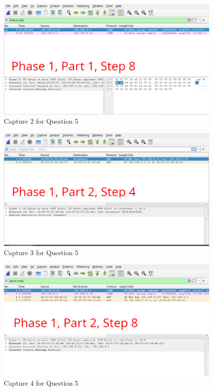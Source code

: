 \begin{figure}
\centering
\includegraphics{data/q5-capture2.png}
\caption{Capture 2 for Question 5}
\end{figure}

\begin{figure}
\centering
\includegraphics{data/q5-capture3.png}
\caption{Capture 3 for Question 5}
\end{figure}

\begin{figure}
\centering
\includegraphics{data/q5-capture4.png}
\caption{Capture 4 for Question 5}
\end{figure}

